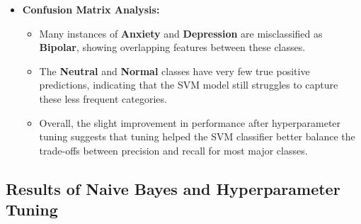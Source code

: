 \begin{itemize}
    \item \textbf{Confusion Matrix Analysis:}
    \begin{itemize}
        \item Many instances of \textbf{Anxiety} and \textbf{Depression} are misclassified as \textbf{Bipolar}, showing overlapping features between these classes.
        \item The \textbf{Neutral} and \textbf{Normal} classes have very few true positive predictions, indicating that the SVM model still struggles to capture these less frequent categories.
        \item Overall, the slight improvement in performance after hyperparameter tuning suggests that tuning helped the SVM classifier better balance the trade-offs between precision and recall for most major classes.
    \end{itemize}
\end{itemize}



\subsection{Results of Naive Bayes and Hyperparameter Tuning}

